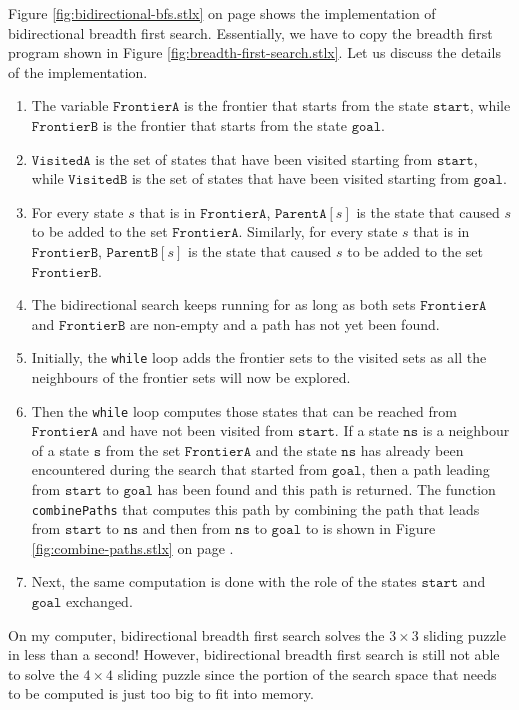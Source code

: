 Figure \ref{fig:bidirectional-bfs.stlx} on page \pageref{fig:bidirectional-bfs.stlx} shows the implementation
of bidirectional breadth first search.  Essentially, we have to copy the breadth first program shown in
Figure \ref{fig:breadth-first-search.stlx}. Let us discuss the details of the implementation.
\begin{enumerate}
\item The variable $\mathtt{FrontierA}$ is the frontier that starts from the state $\mathtt{start}$, while
      $\mathtt{FrontierB}$ is the frontier that starts from the state $\mathtt{goal}$.
\item $\mathtt{VisitedA}$ is the set of states that have been visited starting from $\mathtt{start}$, while
      $\mathtt{VisitedB}$ is the set of states that have been visited starting from $\mathtt{goal}$.
\item For every state $s$ that is in $\mathtt{FrontierA}$, $\mathtt{ParentA}[s]$ is the state that caused $s$
      to be added to the set $\mathtt{FrontierA}$.  Similarly, for every state $s$ that is in $\mathtt{FrontierB}$,
      $\mathtt{ParentB}[s]$ is the state that caused $s$ to be added to the set $\mathtt{FrontierB}$.  
\item The bidirectional search keeps running for as long as both sets $\mathtt{FrontierA}$ and
      $\mathtt{FrontierB}$ are non-empty and a path has not yet been found.
\item Initially, the \texttt{while} loop adds the frontier sets to the visited sets
      as all the neighbours of the frontier sets will now be explored.
\item Then the \texttt{while} loop computes those states that can be reached from $\mathtt{FrontierA}$ and have not been
      visited from $\mathtt{start}$.  If a state $\mathtt{ns}$ is a neighbour of a state $\mathtt{s}$ from the set 
      $\mathtt{FrontierA}$ and the state $\mathtt{ns}$ has already been encountered during the search that started
      from $\mathtt{goal}$, then a path leading from $\mathtt{start}$ to $\mathtt{goal}$ has been found and this path
      is returned.  The function \texttt{combinePaths} that computes this path by combining the path that leads
      from $\mathtt{start}$ to $\mathtt{ns}$ and then from $\mathtt{ns}$ to $\mathtt{goal}$ to is shown in Figure
      \ref{fig:combine-paths.stlx} on page \pageref{fig:combine-paths.stlx}.
\item Next, the same computation is done with the role of the states $\mathtt{start}$ and $\mathtt{goal}$ exchanged.
\end{enumerate}
On my computer, bidirectional breadth first search solves the $3 \times 3$ sliding puzzle in less than a
second!  However, bidirectional breadth first search is still not able to solve the $4 \times 4$ sliding puzzle
since the portion of the search space that needs to be computed is just too big to fit into memory.

